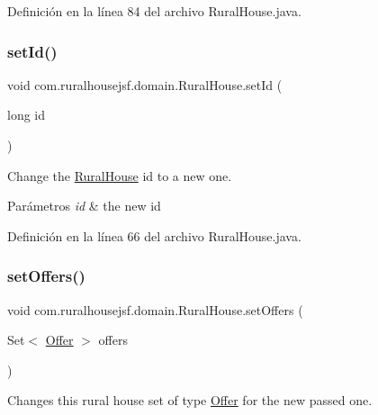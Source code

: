 Definición en la línea 84 del archivo Rural\+House.\+java.

\mbox{\label{classcom_1_1ruralhousejsf_1_1domain_1_1_rural_house_aaea8ea8cb5cb886fb0b7e38bb7546472}} 
\subsubsection{\texorpdfstring{setId()}{setId()}}
{\footnotesize\ttfamily void com.\+ruralhousejsf.\+domain.\+Rural\+House.\+set\+Id (\begin{DoxyParamCaption}\item[{long}]{id }\end{DoxyParamCaption})}

Change the \mbox{\hyperlink{classcom_1_1ruralhousejsf_1_1domain_1_1_rural_house}{Rural\+House}} id to a new one.


\begin{DoxyParams}{Parámetros}
{\em id} & the new id \\
\hline
\end{DoxyParams}


Definición en la línea 66 del archivo Rural\+House.\+java.

\mbox{\label{classcom_1_1ruralhousejsf_1_1domain_1_1_rural_house_a6edffd501fd0be08f923be5a1615e1fb}} 
\subsubsection{\texorpdfstring{setOffers()}{setOffers()}}
{\footnotesize\ttfamily void com.\+ruralhousejsf.\+domain.\+Rural\+House.\+set\+Offers (\begin{DoxyParamCaption}\item[{Set$<$ \mbox{\hyperlink{classcom_1_1ruralhousejsf_1_1domain_1_1_offer}{Offer}} $>$}]{offers }\end{DoxyParamCaption})}

Changes this rural house set of type \mbox{\hyperlink{classcom_1_1ruralhousejsf_1_1domain_1_1_offer}{Offer}} for the new passed one.


